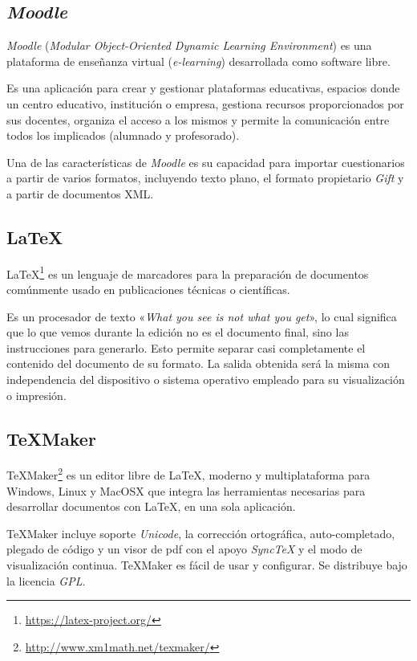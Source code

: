 \subsection{\textit{Moodle}}
\textit{Moodle} (\emph{Modular Object-Oriented Dynamic Learning Environment}) es una plataforma de enseñanza virtual (\emph{e-learning}) desarrollada como software libre.

Es una aplicación para crear y gestionar plataformas educativas, espacios donde un centro educativo, institución o empresa, gestiona recursos proporcionados por sus docentes, organiza el acceso a los mismos y permite la comunicación entre todos los implicados (alumnado y profesorado).

Una de las características de \textit{Moodle} es su capacidad para importar cuestionarios a partir de varios formatos, incluyendo texto plano, el formato propietario \textit{Gift} y a partir de documentos XML.

\subsection{\LaTeX{}}
\LaTeX{}\footnote{\url{https://latex-project.org/}} es un lenguaje de marcadores para la preparación de documentos comúnmente usado en publicaciones técnicas o científicas.

Es un procesador de texto «\emph{What you see is not what you get}», lo cual significa que lo que vemos durante la edición no es el documento final, sino las instrucciones para generarlo.
Esto permite separar casi completamente el contenido del documento de su formato. La salida obtenida será la misma con independencia del dispositivo o sistema operativo empleado para su visualización o impresión.

\subsection{\TeX{}Maker}
\TeX{}Maker\footnote{\url{http://www.xm1math.net/texmaker/}} es un editor libre de \LaTeX{}, moderno y multiplataforma para Windows, Linux y MacOSX que integra las herramientas necesarias para desarrollar documentos con \LaTeX{}, en una sola aplicación.

\TeX{}Maker incluye soporte \textit{Unicode}, la corrección ortográfica, auto-completado, plegado de código y un visor de pdf con el apoyo \textit{SyncTeX} y el modo de visualización continua. \TeX{}Maker es fácil de usar y configurar. Se distribuye bajo la licencia \textit{GPL}.

